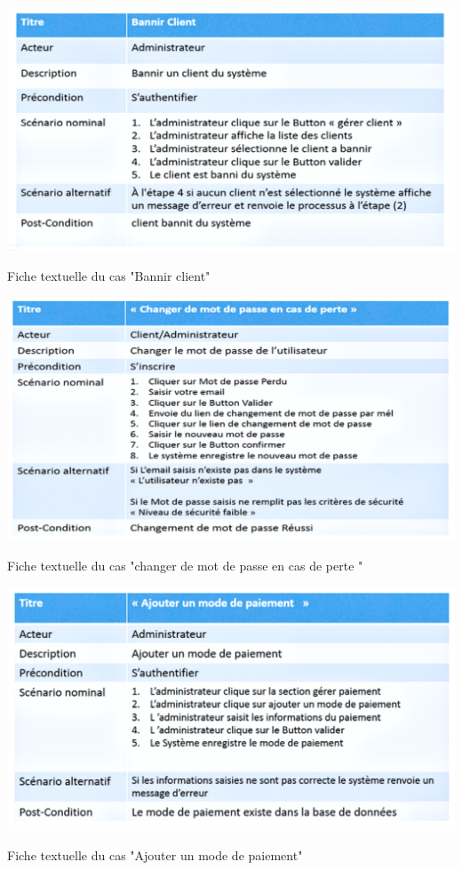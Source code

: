 \documentclass[a4paper, 12pt]{report}
\begin{document}
\begin{table}[H]
	\centering
	\includegraphics{img/fiche/12}
	\caption{Fiche textuelle du cas "Bannir client"}
	\label{Tux}
\end{table}
\begin{table}[H]
	\centering
	\includegraphics{img/fiche/13}
	\caption{Fiche textuelle du cas "changer de mot de passe en cas de perte "}
	\label{Tux}
\end{table}
\begin{table}[H]
	\centering
	\includegraphics{img/fiche/14}
	\caption{Fiche textuelle du cas "Ajouter un mode de paiement"}
	\label{Tux}
\end{table}
\end{document}
